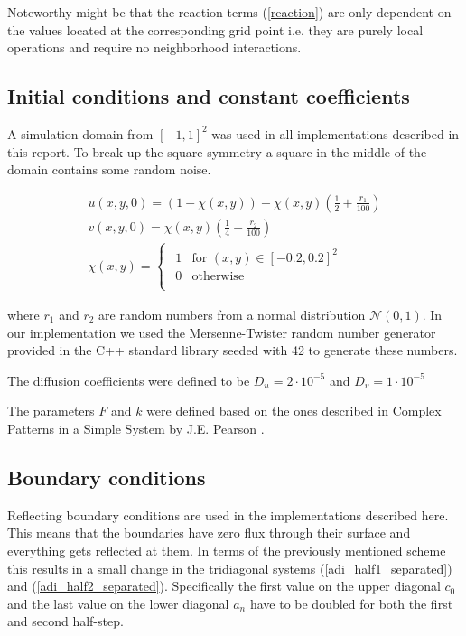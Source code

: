 \documentclass[11pt,a4paper]{article} %
\begin{document}
Noteworthy might be that the reaction terms (\ref{reaction}) are only dependent on the values located at the corresponding grid point i.e. they are purely local operations and require no neighborhood interactions.

\subsection{Initial conditions and constant coefficients}

A simulation domain from $ \left[ -1, 1 \right]^{2} $ was used in all implementations described in this report.
To break up the square symmetry a square in the middle of the domain contains some random noise.

\begin{equation} \label{initial_cond}
\begin{aligned}
u(x,y,0) = (1 - \chi(x,y)) + \chi(x,y) \left( \frac{1}{2} + \frac{r_{1}}{100} \right) \\
v(x,y,0) = \chi(x,y) \left( \frac{1}{4} + \frac{r_{2}}{100} \right) \\
\chi(x,y) = 
\begin{cases}
\begin{array}{ll}
  1	& \text{for } (x,y) \in [-0.2, 0.2]^{2}  \\
  0	& \text{otherwise}  \\
\end{array}	
\end{cases}
\end{aligned}
\end{equation}

where $r_{1}$ and $r_{2}$ are random numbers from a normal distribution $\mathcal{N}(0,1)$.
In our implementation we used the Mersenne-Twister random number generator provided in the C++ standard library seeded with 42 to generate these numbers.

The diffusion coefficients were defined to be $ D_{u} = 2\cdot10^{-5}$ and $ D_{v} = 1\cdot10^{-5}$ 

The parameters $F$ and $k$ were defined based on the ones described in Complex Patterns in a Simple System by J.E. Pearson \cite{Pearson_1993}.

\subsection{Boundary conditions}

Reflecting boundary conditions are used in the implementations described here.
This means that the boundaries have zero flux through their surface and everything gets reflected at them.
In terms of the previously mentioned scheme this results in a small change in the tridiagonal systems (\ref{adi_half1_separated}) and (\ref{adi_half2_separated}).
Specifically the first value on the upper diagonal $c_{0}$ and the last value on the lower diagonal $a_{n}$ have to be doubled for both the first and second half-step.
\end{document}

